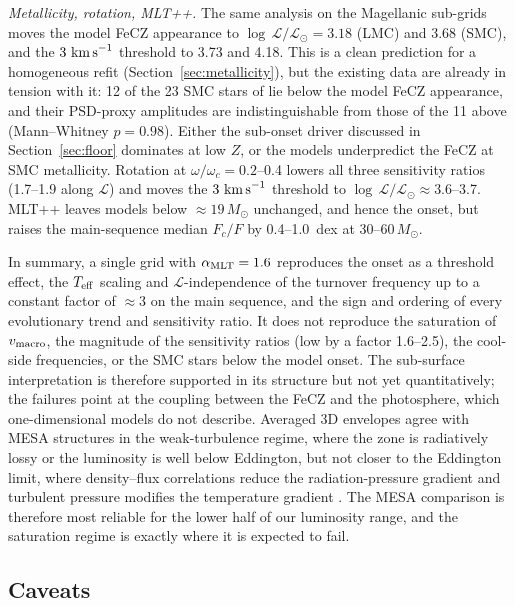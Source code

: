 \documentclass[twocolumn]{aastex631}
\newcommand{\vmac}{v_{\rm macro}}
\newcommand{\teff}{T_{\rm eff}}
\renewcommand{\ell}{\mathcal{L}}
\newcommand{\lgL}{\log\,\ell/\ell_\odot}
\newcommand{\kms}{{\rm km\,s}^{-1}}
\begin{document}
\emph{Metallicity, rotation, MLT++.} The same analysis on the Magellanic sub-grids moves the model FeCZ appearance to $\lgL=3.18$ (LMC) and 3.68 (SMC), and the $3~\kms$ threshold to 3.73 and 4.18. This is a clean prediction for a homogeneous refit (Section~\ref{sec:metallicity}), but the existing data are already in tension with it: 12 of the 23 SMC stars of \citet{bowman2024} lie below the model FeCZ appearance, and their PSD-proxy amplitudes are indistinguishable from those of the 11 above (Mann--Whitney $p=0.98$). Either the sub-onset driver discussed in Section~\ref{sec:floor} dominates at low $Z$, or the models underpredict the FeCZ at SMC metallicity. Rotation at $\omega/\omega_c=0.2$--0.4 lowers all three sensitivity ratios (1.7--1.9 along $\ell$) and moves the $3~\kms$ threshold to $\lgL\approx3.6$--3.7. MLT++ leaves models below $\approx19\,M_\odot$ unchanged, and hence the onset, but raises the main-sequence median $F_c/F$ by 0.4--1.0~dex at 30--$60\,M_\odot$.

In summary, a single grid with $\alpha_{\rm MLT}=1.6$ reproduces the onset as a threshold effect, the $\teff$ scaling and $\ell$-independence of the turnover frequency up to a constant factor of $\approx3$ on the main sequence, and the sign and ordering of every evolutionary trend and sensitivity ratio. It does not reproduce the saturation of $\vmac$, the magnitude of the sensitivity ratios (low by a factor 1.6--2.5), the cool-side frequencies, or the SMC stars below the model onset. The sub-surface interpretation is therefore supported in its structure but not yet quantitatively; the failures point at the coupling between the FeCZ and the photosphere, which one-dimensional models do not describe. Averaged 3D envelopes agree with MESA structures in the weak-turbulence regime, where the zone is radiatively lossy or the luminosity is well below Eddington, but not closer to the Eddington limit, where density--flux correlations reduce the radiation-pressure gradient and turbulent pressure modifies the temperature gradient \citep{schultz2020,schultz2023}. The MESA comparison is therefore most reliable for the lower half of our luminosity range, and the saturation regime is exactly where it is expected to fail.

\subsection{Caveats}\label{sec:caveats}
\end{document}
